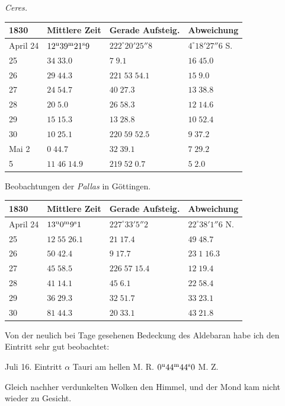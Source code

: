 \begin{center}
\emph{Ceres.}

\begin{tabular}{l|l|l|l}
1830 & Mittlere Zeit & Gerade Aufsteig. & Abweichung \\
\hline
April 24 & $12^{\rm u}39^{\rm m}21^{\rm s}9$ & $222^\circ20'25''8$ & $4^\circ18'27''6$ S. \\
\hfill 25 & $34\;33.0$ & $7\;9.1$ & $16\;45.0$ \\
\hfill 26 & $29\;44.3$ & $221\;53\;54.1$ & $15\;9.0$ \\
\hfill 27 & $24\;54.7$ & $40\;27.3$ & $13\;38.8$ \\
\hfill 28 & $20\;5.0$ & $26\;58.3$ & $12\;14.6$ \\
\hfill 29 & $15\;15.3$ & $13\;28.8$ & $10\;52.4$ \\
\hfill 30 & $10\;25.1$ & $220\;59\;52.5$ & $9\;37.2$ \\
Mai 2 & $0\;44.7$ & $32\;39.1$ & $7\;29.2$ \\
\hfill 5 & $11\;46\;14.9$ & $219\;52\;0.7$ & $5\;2.0$ \\
\end{tabular}
\end{center}

\begin{center}
Beobachtungen der \emph{Pallas} in Göttingen.

\begin{tabular}{l|l|l|l}
1830 & Mittlere Zeit & Gerade Aufsteig. & Abweichung \\
\hline
April 24 & $13^{\rm u}0^{\rm m}9^{\rm s}1$ & $227^\circ33'5''2$ & $22^\circ38'1''6$ N. \\
\hfill 25 & $12\;55\;26.1$ & $21\;17.4$ & $49\;48.7$ \\
\hfill 26 & $50\;42.4$ & $9\;17.7$ & $23\;1\;16.3$ \\
\hfill 27 & $45\;58.5$ & $226\;57\;15.4$ & $12\;19.4$ \\
\hfill 28 & $41\;14.1$ & $45\;6.1$ & $22\;58.4$ \\
\hfill 29 & $36\;29.3$ & $32\;51.7$ & $33\;23.1$ \\
\hfill 30 & $81\;44.3$ & $20\;33.1$ & $43\;21.8$ \\
\end{tabular}
\end{center}

Von der neulich bei Tage gesehenen Bedeckung des Aldebaran habe ich den Eintritt sehr gut beobachtet:

\begin{center}Juli 16. Eintritt $\alpha$ Tauri am hellen M. R. $0^{\rm u}44^{\rm m}44^{\rm s}0$ M. Z.\end{center}

Gleich nachher verdunkelten Wolken den Himmel, und der Mond kam nicht wieder zu Gesicht.
